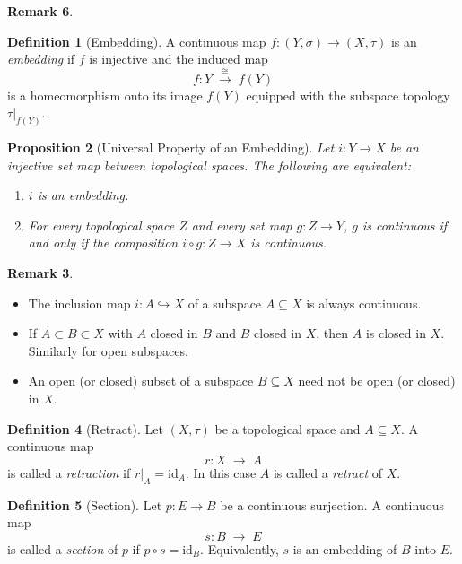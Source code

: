 \documentclass[11pt,a4paper]{article}
\theoremstyle{definition}
\newtheorem{definition}{Definition}[section]
\newtheorem{remark}[definition]{Remark}
\theoremstyle{plain}
\newtheorem{proposition}[definition]{Proposition}
\theoremstyle{remark}
\begin{document}
\begin{remark}
\begin{definition}[Embedding]
A continuous map \(f\colon (Y,\sigma)\to (X,\tau)\) is an \emph{embedding} if \(f\) is injective and the induced map 
\[
  f\colon Y \;\xrightarrow{\cong}\; f(Y)
\]
is a homeomorphism onto its image \(f(Y)\) equipped with the subspace topology \(\tau|_{f(Y)}\).
\end{definition}

\begin{proposition}[Universal Property of an Embedding]
Let \(i\colon Y\to X\) be an injective set map between topological spaces.  The following are equivalent:
\begin{enumerate}
  \item \(i\) is an embedding.
  \item For every topological space \(Z\) and every set map \(g\colon Z\to Y\), \(g\) is continuous if and only if the composition \(i\circ g\colon Z\to X\) is continuous.
\end{enumerate}
\end{proposition}

\begin{remark}
\begin{itemize}
  \item The inclusion map \(i\colon A\hookrightarrow X\) of a subspace \(A\subseteq X\) is always continuous.
  \item If \(A\subset B\subset X\) with \(A\) closed in \(B\) and \(B\) closed in \(X\), then \(A\) is closed in \(X\).  Similarly for open subspaces.
  \item An open (or closed) subset of a subspace \(B\subseteq X\) need not be open (or closed) in \(X\).
\end{itemize}
\end{remark}

\begin{definition}[Retract]
Let \((X,\tau)\) be a topological space and \(A\subseteq X\).  A continuous map
\[
  r\colon X\;\longrightarrow\;A
\]
is called a \emph{retraction} if \(r|_{A} = \mathrm{id}_A\).  In this case \(A\) is called a \emph{retract} of \(X\).
\end{definition}

\begin{definition}[Section]
Let \(p\colon E\to B\) be a continuous surjection.  A continuous map
\[
  s\colon B\;\longrightarrow\;E
\]
is called a \emph{section} of \(p\) if \(p\circ s = \mathrm{id}_B\).  Equivalently, \(s\) is an embedding of \(B\) into \(E\).
\end{definition}


\end{remark}
\end{document}
